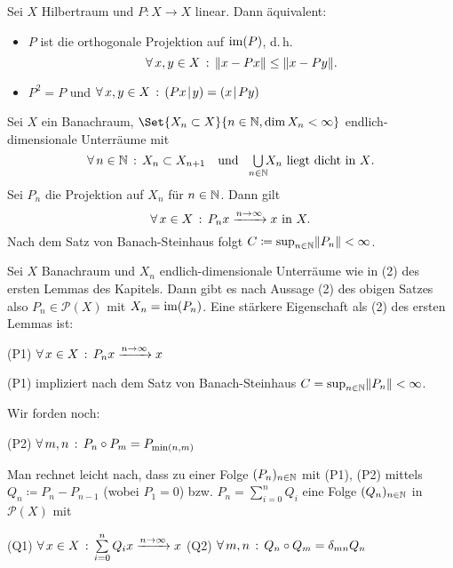 \documentclass{cheat-sheet}
\newcommand{\scp}[2]{\left( #1 \!\mid\! #2 \right)} %
\newcommand{\convWith}[1]{\xrightarrow{#1 \to \infty}} %
\begin{document}

\begin{lem}
  Sei $X$ Hilbertraum und $P : X {\to} X$ linear. Dann äquivalent:
  \begin{itemize}
    \item $P$ ist die orthogonale Projektion auf $\mathop{\mathrm{im}}(P)$, d.\,h.
    \[ \forall \, {x,y \in X} \,:\, \lVert x-Px\rVert \leq \lVert x - Py\rVert. \]
    \item $P^2 = P$ und $\fa{x,y \in X} \scp{Px}{y} = \scp{x}{Py}$
    \miniitem{0.52 \linewidth}{$\fa{x,y \in X} \scp{x-Px}{Py} = 0$}
  \end{itemize}
\end{lem}

\begin{samepage}

\begin{bem}
  Sei $X$ ein Banachraum, $\Set{X_n \subset X}{ n \in \N, \dim X_n < \infty }$ endlich-dimensionale Unterräume mit
  \[
    \fa{n \in \N} X_n \subset X_{n{+}1}
    \quad \text{und} \quad
    \bigcup_{\mathclap{n \in \N}} X_n \text{ liegt dicht in $X$.}
  \]
  Sei $P_n$ die Projektion auf $X_n$ für $n \in \mathbb{N}$. Dann gilt
  \[ \fa{x \in X} P_n x \convWith{n} x \text{ in } X. \]
  Nach dem Satz von Banach-Steinhaus folgt $C \coloneqq \sup_{n \in \mathbb{N}} \lVert P_n\rVert < \infty$.
\end{bem}

\iffalse
Sei $X$ Banachraum und $X_n$ endlich-dimensionale Unterräume wie in (2) des ersten Lemmas des Kapitels. Dann gibt es nach Aussage (2) des obigen Satzes also $P_n \in \mathcal{P}(X)$ mit $X_n = \mathop{\mathrm{im}}(P_n)$. Eine stärkere Eigenschaft als (2) des ersten Lemmas ist:

(P1) $\forall \, {x \in X} \,:\, P_n x \xrightarrow{n \to \infty} x$

(P1) impliziert nach dem Satz von Banach-Steinhaus $C = \sup_{n \in \mathbb{N}} \lVert P_n\rVert < \infty$.

Wir forden noch:

(P2) $\forall \, {m, n} \,:\, P_n \circ P_m = P_{\min(n, m)}$

Man rechnet leicht nach, dass zu einer Folge $(P_n)_{n \in \mathbb{N}}$ mit (P1), (P2) mittels $Q_n \coloneqq P_n - P_{n-1}$ (wobei $P_1 = 0$) bzw. $P_n = \sum_{i=0}^n Q_i$ eine Folge $(Q_n)_{n \in \mathbb{N}}$ in $\mathcal{P}(X)$ mit

(Q1) $\fa{x \in X} \sum_{i=0}^n Q_i x \xrightarrow{n \to \infty} x$
(Q2) $\forall \, {m,n} \,:\, Q_n \circ Q_m = \delta_{mn} Q_n$


\end{samepage}
\end{document}
